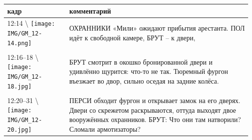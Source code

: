 \begin{longtable}[]{@{}ll@{}}
\toprule
\begin{minipage}[b]{0.27\columnwidth}\raggedright\strut
кадр\strut
\end{minipage} & \begin{minipage}[b]{0.68\columnwidth}\raggedright\strut
комментарий\strut
\end{minipage}\tabularnewline
\midrule
\endhead
\begin{minipage}[t]{0.27\columnwidth}\raggedright\strut
12:14 \textbackslash{}
\texttt{[image: IMG/GM\_12-14.png]}\strut
\end{minipage} & \begin{minipage}[t]{0.68\columnwidth}\raggedright\strut
ОХРАННИКИ «Мили» ожидают прибытия арестанта.
ПОЛ идёт к свободной камере, БРУТ -- к двери,\strut
\end{minipage}\tabularnewline
\begin{minipage}[t]{0.27\columnwidth}\raggedright\strut
\strut
\end{minipage} & \begin{minipage}[t]{0.68\columnwidth}\raggedright\strut
\strut
\end{minipage}\tabularnewline
\begin{minipage}[t]{0.27\columnwidth}\raggedright\strut
12:16--18 \textbackslash{}
\texttt{[image: IMG/GM\_12-18.jpg]}\strut
\end{minipage} & \begin{minipage}[t]{0.68\columnwidth}\raggedright\strut
БРУТ смотрит в окошко бронированной двери и удивлённо
щурится: что-то не так.
Тюремный фургон въезжает во двор, сильно оседая на задние
колёса.\strut
\end{minipage}\tabularnewline
\begin{minipage}[t]{0.27\columnwidth}\raggedright\strut
\strut
\end{minipage} & \begin{minipage}[t]{0.68\columnwidth}\raggedright\strut
\strut
\end{minipage}\tabularnewline
\begin{minipage}[t]{0.27\columnwidth}\raggedright\strut
12:20--31 \textbackslash{}
\texttt{[image: IMG/GM\_12-20.jpg]}\strut
\end{minipage} & \begin{minipage}[t]{0.68\columnwidth}\raggedright\strut
ПЕРСИ обходит фургон и открывает замок на его дверях.
Двери со скрежетом раскрываются, оттуда выходят
двое вооружённых охранников.
БРУТ: Что они там натворили? Сломали армотизаторы?\strut

\end{minipage}
\end{longtable}

